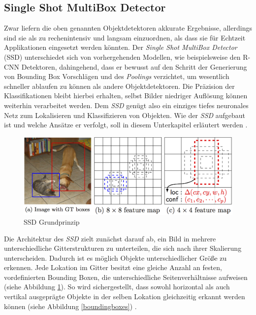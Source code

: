 \subsection*{Single Shot MultiBox Detector}

Zwar liefern die oben genannten Objektdetektoren akkurate Ergebnisse, allerdings sind sie als zu rechenintensiv und langsam einzuordnen, als dass sie für Echtzeit Applikationen eingesetzt werden könnten. Der \textit{Single Shot MultiBox Detector} (SSD) unterschiedet sich von vorhergehenden Modellen, wie beispielsweise den R-CNN Detektoren, dahingehend, dass er bewusst auf den Schritt der Generierung von Bounding Box Vorschlägen und des \textit{Poolings} verzichtet, um wesentlich schneller ablaufen zu können als andere Objektdetektoren. Die Präzision der Klassifikationen bleibt hierbei erhalten, selbst Bilder niedriger Auflösung können weiterhin verarbeitet werden. Dem \textit{SSD} genügt also ein einziges tiefes neuronales Netz zum Lokalisieren und Klassifizieren von Objekten. Wie der \textit{SSD} aufgebaut ist und welche Ansätze er verfolgt, soll in diesem Unterkapitel erläutert werden \cite{ssd.20161229}. 

\begin{figure}[ht]
	\begin{center}
		\includegraphics[width=15cm]{Bilder/ssd_framework.png} 
		\caption[SSD Grundprinzip]{SSD Grundprinzip \cite{ssd.20161229}}
		\label{framework}
	\end{center}
\end{figure}

Die Architektur des \textit{SSD} zielt zunächst darauf ab, ein Bild in mehrere unterschiedliche Gitterstrukturen zu unterteilen, die sich nach ihrer Skalierung unterscheiden. Dadurch ist es möglich Objekte unterschiedlicher Größe zu erkennen. Jede Lokation im Gitter besitzt eine gleiche Anzahl an festen, vordefinierten Bounding Boxen, die unterschiedliche Seitenverhältnisse aufweisen (siehe Abbildung \ref{framework}). So wird sichergestellt, dass sowohl horizontal als auch vertikal ausgeprägte Objekte in der selben Lokation gleichzeitig erkannt werden können (siehe Abbildung \ref{boundingboxes}) \cite{ssd.20161229}.

